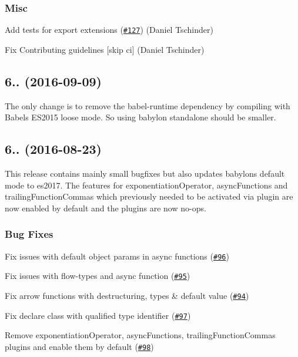 \subsubsection*{Misc}


\begin{DoxyItemize}
\item Add tests for export extensions (\href{https://github.com/babel/babylon/pull/127}{\tt \#127}) (Daniel Tschinder)
\item Fix Contributing guidelines \mbox{[}skip ci\mbox{]} (Daniel Tschinder)
\end{DoxyItemize}

\subsection*{6.. (2016-\/09-\/09)}

The only change is to remove the {\ttfamily babel-\/runtime} dependency by compiling with Babel\textquotesingle{}s E\+S2015 loose mode. So using babylon standalone should be smaller.

\subsection*{6.. (2016-\/08-\/23)}

This release contains mainly small bugfixes but also updates babylons default mode to es2017. The features for {\ttfamily exponentiation\+Operator}, {\ttfamily async\+Functions} and {\ttfamily trailing\+Function\+Commas} which previously needed to be activated via plugin are now enabled by default and the plugins are now no-\/ops.

\subsubsection*{Bug Fixes}


\begin{DoxyItemize}
\item Fix issues with default object params in async functions (\href{https://github.com/babel/babylon/pull/96}{\tt \#96}) 
\item Fix issues with flow-\/types and async function (\href{https://github.com/babel/babylon/pull/95}{\tt \#95}) 
\item Fix arrow functions with destructuring, types \& default value (\href{https://github.com/babel/babylon/pull/94}{\tt \#94}) 
\item Fix declare class with qualified type identifier (\href{https://github.com/babel/babylon/pull/97}{\tt \#97}) 
\item Remove exponentiation\+Operator, async\+Functions, trailing\+Function\+Commas plugins and enable them by default (\href{https://github.com/babel/babylon/pull/98}{\tt \#98}) 
\end{DoxyItemize}

